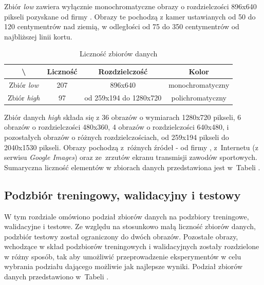Zbiór \textit{low} zawiera wyłącznie monochromatyczne obrazy o rozdzielczości 896x640 pikseli pozyskane od firmy \blue{}. Obrazy te pochodzą z kamer ustawianych od 50 do 120 centymentrów nad ziemią, w odległości od 75 do 350 centymentrów od najbliższej linii kortu.

\begin{table}[!h]
	\centering
	\caption{Liczność zbiorów danych}
	\vspace{6pt}
	{\footnotesize
		\begin{tabular}{|c|c|c|c|}
			\hline \textbackslash & Liczność & Rozdzielczość & Kolor \\
      \hline Zbiór \textit{low} & 207 & 896x640 & monochromatyczny \\
      \hline Zbiór \textit{high} & 97 & od 259x194 do 1280x720 & polichromatyczny \\
      \hline
    \end{tabular}
    \label{Tab:licznosc}
	}
	\vspace{0pt}
\end{table}

Zbiór danych \textit{high} składa się z 36 obrazów o wymiarach 1280x720 pikseli, 6 obrazów o rozdzielczości 480x360, 4 obrazów o rozdzielczości 640x480, i pozostałych obrazów o różnych rozdzielczościach, od 259x194 pikseli do 2040x1530 pikseli. Obrazy pochodzą z~różnych źródeł - od firmy \blue{}, z~Internetu (z serwisu \textit{Google Images}) oraz ze~zrzutów ekranu transmisji zawodów sportowych. Sumaryczna liczność elementów w zbiorach danych przedstawiona jest w~Tabeli .

\subsection{Podzbiór treningowy, walidacyjny i testowy}
\label{sec:podzial}
W tym rozdziale omówiono podział zbiorów danych na podzbiory treningowe, walidacyjne i testowe.
Ze względu na stosunkowo małą liczność zbiorów danych, podzbiór testowy został ograniczony do dwóch obrazów.
Pozostałe obrazy, wchodzące w skład podzbiorów treningowych i walidacyjnych zostały rozdzielone w różny sposób, tak aby umożliwić przeprowadzenie eksperymentów w celu wybrania podziału dającego możliwie jak najlepsze wyniki.
Podział zbiorów danych przedstawiono w~Tabeli .

